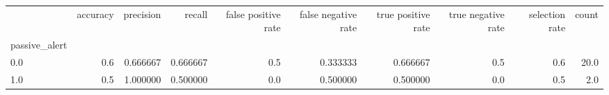 \begin{tabular}{lrrrrrrrrr}
\toprule
{} &  accuracy &  precision &    recall &  false positive rate &  false negative rate &  true positive rate &  true negative rate &  selection rate &  count \\
passive\_alert &           &            &           &                      &                      &                     &                     &                 &        \\
\midrule
0.0           &       0.6 &   0.666667 &  0.666667 &                  0.5 &             0.333333 &            0.666667 &                 0.5 &             0.6 &   20.0 \\
1.0           &       0.5 &   1.000000 &  0.500000 &                  0.0 &             0.500000 &            0.500000 &                 0.0 &             0.5 &    2.0 \\
\bottomrule
\end{tabular}
